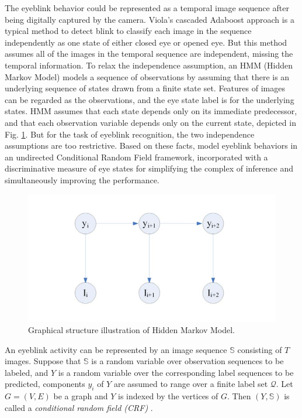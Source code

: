 \documentclass[journal]{IEEEtran}
\begin{document}
The eyeblink behavior could be represented as a temporal image sequence after being digitally captured by the camera. Viola's cascaded Adaboost approach \cite{viola2001rapid} is a typical method to detect blink to classify each image in the sequence independently as one state of either closed eye or opened eye. But this method assumes all of the images in the temporal sequence are independent, missing the temporal information. To relax the independence assumption, an HMM (Hidden Markov Model) \cite{rabiner1989tutorial} models a sequence of observations by assuming that there is an underlying sequence of states drawn from a finite state set. Features of images can be regarded as the observations, and the eye state label is for the underlying states. HMM assumes that each state depends only on its immediate predecessor, and that each observation variable depends only on the current state, depicted in Fig. \ref{fig_D_1}. But for the task of eyeblink recognition, the two independence assumptions are too restrictive. Based on these facts, \cite{pan2007eyeblink} model eyeblink behaviors in an undirected Conditional Random Field framework, incorporated with a discriminative measure of eye states for simplifying the complex of inference and simultaneously improving the performance.

\begin{figure}[!t]
\centering
\includegraphics[width=1\linewidth]{img/D_1}
\caption{Graphical structure illustration of Hidden Markov Model.}
\label{fig_D_1}
\end{figure}

An eyeblink activity can be represented by an image sequence $\mathbb{S}$ consisting of $T$ images. Suppose that $\mathbb{S}$ is a random variable over observation sequences to be labeled, and $Y$ is a random variable over the corresponding label sequences to be predicted, components $y_i$ of $Y$ are assumed to range over a finite label set $\mathcal{Q}$. Let $G=(V,E)$ be a graph and $Y$ is indexed by the vertices of $G$. Then $(Y, \mathbb{S})$ is called a \textit{conditional random field (CRF)} \cite{lafferty2001conditional}.
\end{document}
